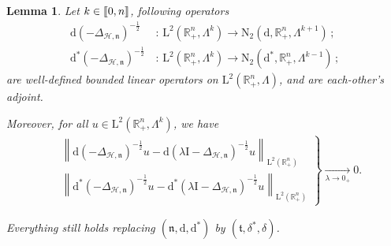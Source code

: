 \documentclass[10pt]{amsart}
\newtheorem{lemm}[theo]{Lemma}\newtheorem{prop}[theo]{Proposition}\newtheorem{coro}[theo]{Corollary}\newtheorem{conj}[theo]{Conjecture}
\theoremstyle{definition}\newtheorem{defi}[theo]{Definition}\newtheorem{rema}[theo]{Remark}\newtheorem{exam}[theo]{Example}\newtheorem{exem}[theo]{Example}\newtheorem{nota}[theo]{Notation}
\newcommand{\bbR}{\mathbb{R}}
\newcommand{\rmd}{\mathrm{d}}
\newcommand{\rmL}{\mathrm{L}}
\newcommand{\rmN}{\mathrm{N}}
\newcommand{\rmI}{\mathrm{I}}
\newcommand{\clH}{\mathcal{H}}
\newcommand{\fkn}{\mathfrak{n}}
\newcommand{\fkt}{\mathfrak{t}}
\newcommand{\llbracket}{\mathopen{[\mkern -2.7mu[}}
\newcommand{\rrbracket}{\mathclose{]\mkern -2.7mu]}}
\newcommand{\llb}{\llbracket}
\newcommand{\rrb}{\rrbracket}
\begin{document}
\begin{lemm}\label{lem:RiesztransfHodgeL2Rn+}
Let $k\in\llb 0,n\rrb$, following operators
\begin{align*}
\rmd(-\Delta_{\clH,\fkn})^{-\frac{1}{2}}\,&:\,\rmL^2\left(\bbR^{n}_+,\Lambda^k\right)\longrightarrow \rmN _2\left(\rmd,\bbR^{n}_+,\Lambda^{k+1}\right)\, ;\\
\rmd^\ast(-\Delta_{\clH,\fkn})^{-\frac{1}{2}}\,&:\,\rmL^2\left(\bbR^{n}_+,\Lambda^k\right)\longrightarrow \rmN_2\left(\rmd^\ast,\bbR^{n}_+,\Lambda^{k-1}\right)\, ;
\end{align*}
are well-defined bounded linear operators on
$\rmL^2(\bbR^{n}_+,\Lambda)$, and are each-other's adjoint.

Moreover, for all $u\in\rmL^2(\bbR^{n}_+,\Lambda^k)$, we have
\begin{align*}
\left.
\begin{array}{ll}
&\left\| \rmd(-\Delta_{\clH,\fkn})^{-\frac{1}{2}} u - \rmd(\lambda\rmI -\Delta_{\clH,\fkn})^{-\frac{1}{2}} u\right\|_{\rmL^2\left(\bbR^n_+\right)} \\
& \left\| \rmd^\ast\left(-\Delta_{\clH,\fkn}\right)^{-\frac{1}{2}} u - \rmd^\ast(\lambda\rmI -\Delta_{\clH,\fkn})^{-\frac{1}{2}} u\right\|_{\rmL^2\left(\bbR^n_+\right)}
\end{array}\right\}\xrightarrow[\lambda \rightarrow 0_+]{}0.
\end{align*}

Everything still holds replacing $(\fkn,\rmd,\rmd^\ast)$ by $(\fkt,\delta^\ast,\delta)$.
\end{lemm}
\end{document}
